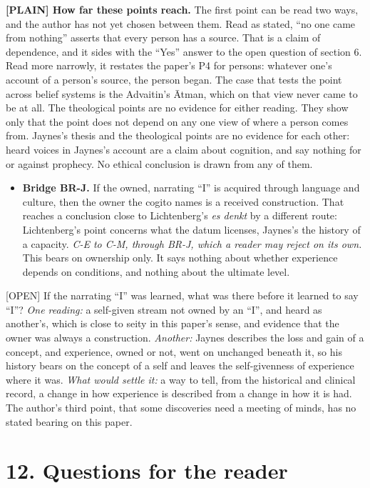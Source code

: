 \documentclass[11pt]{article}
\newcommand{\register}[1]{{\ttfamily\small #1}}
\begin{document}
\textbf{\register{[PLAIN]} How far these points reach.} The first point can be read two ways, and the author has not yet chosen between them. Read as stated, ``no one came from nothing'' asserts that every person has a source. That is a claim of dependence, and it sides with the ``Yes'' answer to the open question of section 6. Read more narrowly, it restates the paper's P4 for persons: whatever one's account of a person's source, the person began. The case that tests the point across belief systems is the Advaitin's Ātman, which on that view never came to be at all. The theological points are no evidence for either reading. They show only that the point does not depend on any one view of where a person comes from. Jaynes's thesis and the theological points are no evidence for each other: heard voices in Jaynes's account are a claim about cognition, and say nothing for or against prophecy. No ethical conclusion is drawn from any of them.

\begin{itemize}
\item \textbf{Bridge BR-J.} If the owned, narrating ``I'' is acquired through language and culture, then the owner the cogito names is a received construction. That reaches a conclusion close to Lichtenberg's \emph{es denkt} by a different route: Lichtenberg's point concerns what the datum licenses, Jaynes's the history of a capacity. \emph{C-E to C-M, through BR-J, which a reader may reject on its own.} This bears on ownership only. It says nothing about whether experience depends on conditions, and nothing about the ultimate level.
\end{itemize}
\register{[OPEN]} If the narrating ``I'' was learned, what was there before it learned to say ``I''? \emph{One reading:} a self-given stream not owned by an ``I'', and heard as another's, which is close to seity in this paper's sense, and evidence that the owner was always a construction. \emph{Another:} Jaynes describes the loss and gain of a concept, and experience, owned or not, went on unchanged beneath it, so his history bears on the concept of a self and leaves the self-givenness of experience where it was. \emph{What would settle it:} a way to tell, from the historical and clinical record, a change in how experience is described from a change in how it is had. The author's third point, that some discoveries need a meeting of minds, has no stated bearing on this paper.

\section*{12. Questions for the reader}
\end{document}
